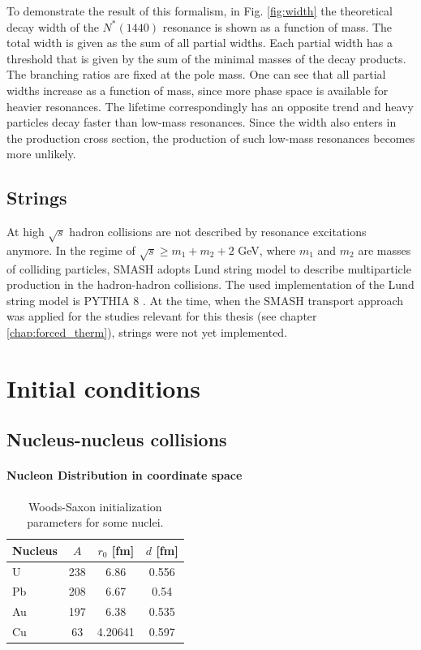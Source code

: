 To demonstrate the result of this formalism, in Fig. \ref{fig:width} the
theoretical decay width of the $N^*(1440)$ resonance is shown as a function of
mass. The total width is given as the sum of all partial widths. Each partial
width has a threshold that is given by the sum of the minimal masses of the
decay products. The branching ratios are fixed at the pole mass. One can see
that all partial widths increase as a function of mass, since more phase space
is available for heavier resonances. The lifetime correspondingly has an
opposite trend and heavy particles decay faster than low-mass resonances. Since
the width also enters in the production cross section, the
production of such low-mass resonances becomes more unlikely.

\subsection{Strings} \label{sec:strings}

At high $\sqrt{s}$ hadron collisions are not described by resonance excitations
anymore. In the regime of $\sqrt{s} \ge m_1 + m_2 + 2$ GeV, where $m_1$ and $m_2$
are masses of colliding particles, SMASH adopts Lund string model \cite{Andersson:1983ia}
to describe multiparticle production in the hadron-hadron collisions.
The used implementation of the Lund string model is PYTHIA 8 \cite{Sjostrand:2007gs}.
At the time, when the SMASH transport approach was applied for the studies relevant for
this thesis (see chapter \ref{chap:forced_therm}), strings were not yet implemented. 

\section{Initial conditions}

\subsection{Nucleus-nucleus collisions}

\paragraph{Nucleon Distribution in coordinate space}

\begin{table}
\caption{\label{tab:nuclei} Woods-Saxon initialization parameters for some nuclei.}
\begin{tabular}{lccc}
\toprule
Nucleus & $A$ & $r_0$ [fm] & $d$ [fm] \\
\midrule
U &  238 & 6.86 & 0.556  \\
Pb & 208 & 6.67 & 0.54 \\
Au & 197 & 6.38 & 0.535 \\
Cu & 63 & 4.20641 & 0.597  \\
\bottomrule
\end{tabular}
\end{table}

